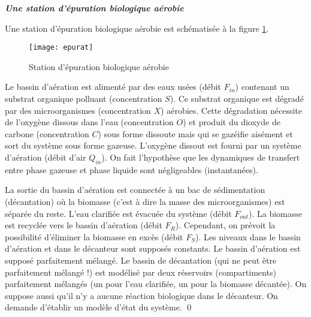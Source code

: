 \begin{exercice}{\bf \em Une station d'épuration biologique aérobie}

Une station d'épuration biologique aérobie est schématisée à la
figure \ref{Fig:epurat}.
\begin{figure}[htbp] 
   \centering
   \texttt{[image: epurat]} 
   \caption{Station d'épuration biologique aérobie}
   \label{Fig:epurat}
\end{figure}
Le bassin d'aération est alimenté par des eaux  usées
(débit
$F_{in}$) contenant un substrat organique polluant  (concentration $S$). 
Ce substrat organique est dégradé par des microorganismes
(concentration $X$) aérobies.  Cette dégradation nécessite de
l'oxygène dissous dans l'eau (concentration $O$) et produit du dioxyde
de carbone (concentration
$C$) sous forme dissoute mais qui se gazéifie aisément et sort du
système sous forme gazeuse.  L'oxygène dissout est fourni par un
système d'aération (débit d'air $Q_{in}$).  On fait l'hypothèse que
les dynamiques de transfert entre phase gazeuse et phase liquide sont
négligeables (instantanées).

La sortie du bassin d'aération est connectée à un bac de
sédimentation (décantation) où la biomasse (c'est à dire la masse 
des microorganismes) est séparée du reste.  L'eau clarifiée est
évacuée du système (débit $F_{out}$).  La biomasse est recyclée
vers le bassin d'aération (débit $F_R$).  Cependant, on prévoit la
possibilité d'éliminer la biomasse en excès (débit $F_S$).  Les
niveaux dans le bassin d'aération et dans le décanteur sont
supposés constants.  Le bassin d'aération est supposé parfaitement
mélangé.  Le bassin de décantation (qui ne peut être
parfaitement mélangé !) est modélisé par deux réservoirs
(compartiments) parfaitement mélangés (un pour l'eau clarifiée, un
pour la biomasse décantée).  On suppose aussi qu'il n'y a aucune
réaction biologique dans le décanteur. On demande d'établir un modèle d'état du système. \qed
\end{exercice}
\vv

